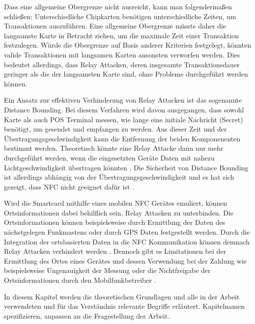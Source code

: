 Dass eine allgemeine Obergrenze nicht ausreicht, kann man folgendermaßen schließen: Unterschiedliche Chipkarten benötigen unterschiedliche Zeiten, um Transaktionen auszuführen. Eine allgemeine Obergrenze müsste daher die langsamste Karte in Betracht ziehen, um die maximale Zeit einer Transaktion festzulegen. Würde die Obergrenze auf Basis anderer Kriterien festgelegt, könnten valide Transaktionen mit langsamen Karten ansonsten verworfen werden. Dies bedeutet allerdings, dass Relay Attacken, deren insgesamte Transaktionsdauer geringer als die der langsamsten Karte sind, ohne Probleme durchgeführt werden können. 

Ein Ansatz zur effektiven Verhinderung von Relay Attacken ist das sogenannte Distance Bounding. Bei diesem Verfahren wird davon ausgegangen, dass sowohl Karte als auch POS Terminal messen, wie lange eine initiale Nachricht (Secret) benötigt, um gesendet und empfangen zu werden. Aus dieser Zeit und der Übertragungsgeschwindigkeit kann die Entfernung der beiden Komponenenten bestimmt werden. Theoretisch könnte eine Relay Attacke dann nur mehr durchgeführt werden, wenn die eingesetzten Geräte Daten mit nahezu Lichtgeschwindigkeit übertragen könnten \cite{nfcRelayWithOffTheShelfHardAndSoftware}. Die Sicherheit von Distance Bounding ist allerdings abhängig von der Übertragungsgeschwindigkeit und es hat sich gezeigt, dass NFC nicht geeignet dafür ist \cite{practicalNfcPeerToPeerRelayMobilePhones}. 

Wird die Smartcard mithilfe eines mobilen NFC Gerätes emuliert, können Ortsinformationen dabei behilflich sein, Relay Attacken zu unterbinden. Die Ortsinformationen können beispielsweise durch Ermittlung der Daten des nächstgelegen Funkmastens oder durch GPS Daten festgestellt werden. Durch die Integration der ortsbasierten Daten in die NFC Kommunikation können demnach Relay Attacken verhindert werden \cite{practicalNfcPeerToPeerRelayMobilePhones}. Dennoch gibt es Limitationen bei der Ermittlung des Ortes eines Gerätes und dessen Verwendung bei der Zahlung wie beispielsweise Ungenauigkeit der Messung oder die Nichtfreigabe der Ortsinformationen durch den Mobilfunkbetreiber \cite{practicalNfcPeerToPeerRelayMobilePhones}. 

\newpage

In diesem Kapitel werden die theoretischen Grundlagen und alle in der Arbeit verwendeten und für das Verständnis relevante Begriffe erläutert. Kapitelnamen spezifizieren, anpassen an die Fragestellung der Arbeit.

